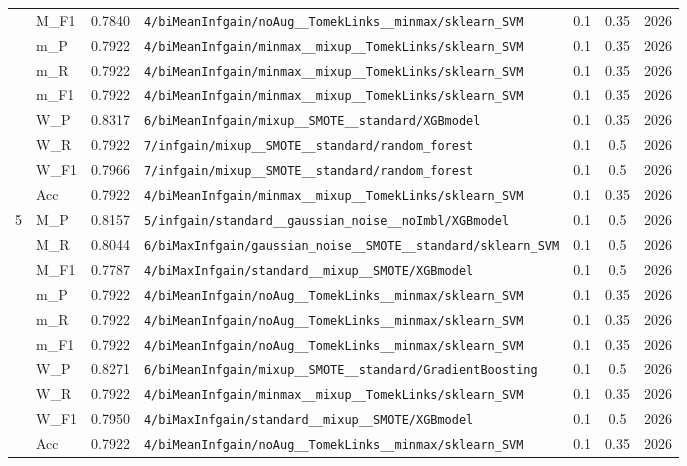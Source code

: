 \begin{table}[htbp]
\begin{tabular}{|c|l|c|>{\ttfamily\footnotesize}p{7.2cm}|c|c|c|}
 & M\_F1 & 0.7840 & \texttt{4/biMeanInfgain/noAug\_\_TomekLinks\_\_minmax/sklearn\_SVM} & 0.1 & 0.35  & 2026 \\ 
 & m\_P & 0.7922 & \texttt{4/biMeanInfgain/minmax\_\_mixup\_\_TomekLinks/sklearn\_SVM} & 0.1 & 0.35  & 2026 \\ 
 & m\_R & 0.7922 & \texttt{4/biMeanInfgain/minmax\_\_mixup\_\_TomekLinks/sklearn\_SVM} & 0.1 & 0.35  & 2026 \\ 
 & m\_F1 & 0.7922 & \texttt{4/biMeanInfgain/minmax\_\_mixup\_\_TomekLinks/sklearn\_SVM} & 0.1 & 0.35  & 2026 \\ 
 & W\_P & 0.8317 & \texttt{6/biMeanInfgain/mixup\_\_SMOTE\_\_standard/XGBmodel} & 0.1 & 0.35  & 2026 \\ 
 & W\_R & 0.7922 & \texttt{7/infgain/mixup\_\_SMOTE\_\_standard/random\_forest} & 0.1 & 0.5  & 2026 \\ 
 & W\_F1 & 0.7966 & \texttt{7/infgain/mixup\_\_SMOTE\_\_standard/random\_forest} & 0.1 & 0.5  & 2026 \\ 
 & Acc & 0.7922 & \texttt{4/biMeanInfgain/minmax\_\_mixup\_\_TomekLinks/sklearn\_SVM} & 0.1 & 0.35  & 2026 \\ 
\hline
\multirow{10}{*}{5} & M\_P & 0.8157 & \texttt{5/infgain/standard\_\_gaussian\_noise\_\_noImbl/XGBmodel} & 0.1 & 0.5  & 2026 \\ 
 & M\_R & 0.8044 & \texttt{6/biMaxInfgain/gaussian\_noise\_\_SMOTE\_\_standard/sklearn\_SVM} & 0.1 & 0.5  & 2026 \\ 
 & M\_F1 & 0.7787 & \texttt{4/biMaxInfgain/standard\_\_mixup\_\_SMOTE/XGBmodel} & 0.1 & 0.5  & 2026 \\ 
 & m\_P & 0.7922 & \texttt{4/biMeanInfgain/noAug\_\_TomekLinks\_\_minmax/sklearn\_SVM} & 0.1 & 0.35  & 2026 \\ 
 & m\_R & 0.7922 & \texttt{4/biMeanInfgain/noAug\_\_TomekLinks\_\_minmax/sklearn\_SVM} & 0.1 & 0.35  & 2026 \\ 
 & m\_F1 & 0.7922 & \texttt{4/biMeanInfgain/noAug\_\_TomekLinks\_\_minmax/sklearn\_SVM} & 0.1 & 0.35  & 2026 \\ 
 & W\_P & 0.8271 & \texttt{6/biMeanInfgain/mixup\_\_SMOTE\_\_standard/GradientBoosting} & 0.1 & 0.5  & 2026 \\ 
 & W\_R & 0.7922 & \texttt{4/biMeanInfgain/minmax\_\_mixup\_\_TomekLinks/sklearn\_SVM} & 0.1 & 0.35  & 2026 \\ 
 & W\_F1 & 0.7950 & \texttt{4/biMaxInfgain/standard\_\_mixup\_\_SMOTE/XGBmodel} & 0.1 & 0.5  & 2026 \\ 
 & Acc & 0.7922 & \texttt{4/biMeanInfgain/noAug\_\_TomekLinks\_\_minmax/sklearn\_SVM} & 0.1 & 0.35  & 2026 \\ 
\hline
\end{tabular}
\end{table}